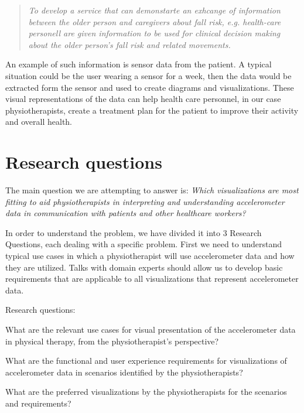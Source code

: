 \begin{quote}
\textit{To develop a service that can demonstarte an exhcange of information between the older person and caregivers about fall risk, e.g. health-care personell are given information to be used for clinical decision making about the older person's fall risk and related movements.}
\end{quote}

An example of such information is sensor data from the patient. A typical situation could be the user wearing a sensor for a week, then the data would be extracted form the sensor and used to create diagrams and visualizations. These visual representations of the data can help health care personnel, in our case physiotherapists, create a treatment plan for the patient to improve their activity and overall health. 

\section{Research questions}
The main question we are attempting to answer is: \textit{Which visualizations are most fitting to aid physiotherapists in interpreting and understanding accelerometer data in communication with patients and other healthcare workers?}

In order to understand the problem, we have divided it into 3 Research Questions, each dealing with a specific problem. First we need to understand typical use cases in which a physiotherapist will use accelerometer data and how they are utilized. Talks with domain experts should allow us to develop basic requirements that are applicable to all visualizations that represent accelerometer data.

Research questions:
\vspace{-15pt}
\begin{description}[parsep=0pt, itemsep=0pt]
\item[Research Question 1:] What are the relevant use cases for visual presentation of the accelerometer data in physical therapy, from the physiotherapist's perspective?

\item[Research Question 2:] What are the functional and user experience requirements for visualizations of accelerometer data in scenarios identified by the physiotherapists?

\item[Research Question 3:] What are the preferred visualizations by the physiotherapists for the scenarios and requirements?
\end{description}

